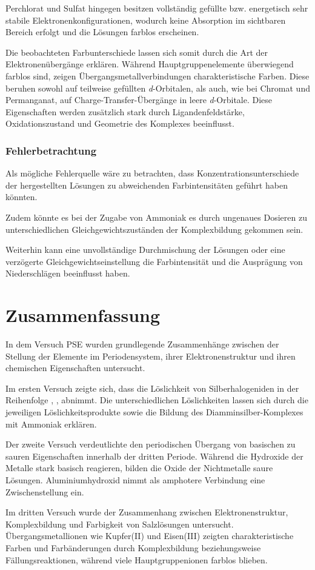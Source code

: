 Perchlorat und Sulfat hingegen besitzen vollständig gefüllte bzw. energetisch sehr stabile Elektronenkonfigurationen, wodurch keine Absorption im sichtbaren Bereich erfolgt und die Lösungen farblos erscheinen.

Die beobachteten Farbunterschiede lassen sich somit durch die Art der Elektronenübergänge erklären. Während Hauptgruppenelemente überwiegend farblos sind, zeigen Übergangsmetallverbindungen charakteristische Farben. Diese beruhen sowohl auf teilweise gefüllten \textit{d}-Orbitalen, als auch, wie bei Chromat und Permanganat, auf Charge-Transfer-Übergänge in leere \textit{d}-Orbitale. Diese Eigenschaften werden zusätzlich stark durch Ligandenfeldstärke, Oxidationszustand und Geometrie des Komplexes beeinflusst. \cite{skript}

\subsubsection{Fehlerbetrachtung}
Als mögliche Fehlerquelle wäre zu betrachten, dass Konzentrationsunterschiede der hergestellten Lösungen zu abweichenden Farbintensitäten geführt haben könnten.

Zudem könnte es bei der Zugabe von Ammoniak es durch ungenaues Dosieren zu unterschiedlichen Gleichgewichtszuständen der Komplexbildung gekommen sein.

Weiterhin kann eine unvollständige Durchmischung der Lösungen oder eine verzögerte Gleichgewichtseinstellung die Farbintensität und die Ausprägung von Niederschlägen beeinflusst haben.

\newpage

\section{Zusammenfassung}
In dem Versuch PSE wurden grundlegende Zusammenhänge zwischen der Stellung der Elemente im Periodensystem, ihrer Elektronenstruktur und ihren chemischen Eigenschaften untersucht.

Im ersten Versuch zeigte sich, dass die Löslichkeit von Silberhalogeniden in der Reihenfolge , ,  abnimmt. Die unterschiedlichen Löslichkeiten lassen sich durch die jeweiligen Löslichkeitsprodukte sowie die Bildung des Diamminsilber-Komplexes mit Ammoniak erklären.

Der zweite Versuch verdeutlichte den periodischen Übergang von basischen zu sauren Eigenschaften innerhalb der dritten Periode. Während die Hydroxide der Metalle stark basisch reagieren, bilden die Oxide der Nichtmetalle saure Lösungen. Aluminiumhydroxid nimmt als amphotere Verbindung eine Zwischenstellung ein.

Im dritten Versuch wurde der Zusammenhang zwischen Elektronenstruktur, Komplexbildung und Farbigkeit von Salzlösungen untersucht. Übergangsmetallionen wie Kupfer(II) und Eisen(III) zeigten charakteristische Farben und Farbänderungen durch Komplexbildung beziehungsweise Fällungsreaktionen, während viele Hauptgruppenionen farblos blieben.